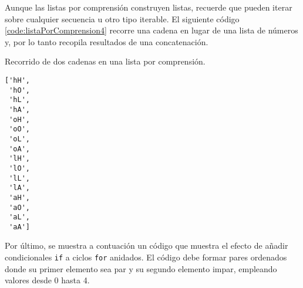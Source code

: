 Aunque las listas por comprensión construyen listas, recuerde que pueden
iterar sobre cualquier secuencia u otro tipo iterable. El siguiente
código \ref{code:listaPorComprension4} recorre una cadena en lugar de una 
lista de números y, por lo tanto recopila resultados de una concatenación.\\

\begin{code} Recorrido de dos cadenas en una lista por comprensión.

\begin{Shaded}
\begin{Highlighting}[]
\OperatorTok{=}\NormalTok{ [x}\OperatorTok{+}   \NormalTok{]}
\end{Highlighting}
\end{Shaded}

\begin{verbatim}
['hH',
 'hO',
 'hL',
 'hA',
 'oH',
 'oO',
 'oL',
 'oA',
 'lH',
 'lO',
 'lL',
 'lA',
 'aH',
 'aO',
 'aL',
 'aA']
\end{verbatim}
\label{code:listaPorComprension4}
\end{code}

Por último, se muestra a contuación un código que muestra el efecto de
añadir condicionales \texttt{if} a ciclos \texttt{for} anidados. El
código debe formar pares ordenados donde su primer elemento sea par y su
segundo elemento impar, empleando valores desde 0 hasta 4. \\

